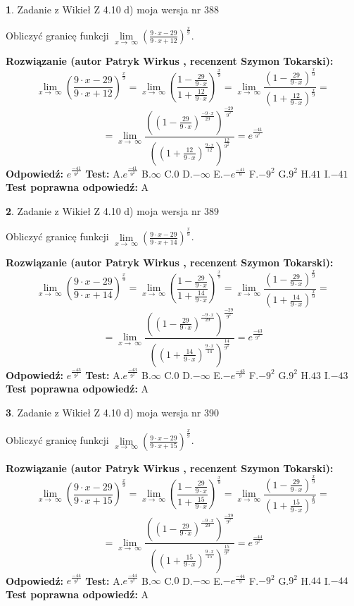 \documentclass[12pt, a4paper]{article}
\theoremstyle{definition} %
\newtheorem{zad}{}
\newcommand{\zadStart}[1]{\begin{zad}#1\newline}
\newcommand{\zadStop}{\end{zad}}
\newcommand{\rozwStart}[2]{\noindent \textbf{Rozwiązanie (autor #1 , recenzent #2): }\newline}
\newcommand{\rozwStop}{\newline}
\newcommand{\odpStart}{\noindent \textbf{Odpowiedź:}\newline}
\newcommand{\odpStop}{\newline}
\newcommand{\testStart}{\noindent \textbf{Test:}\newline}
\newcommand{\testStop}{\newline}
\newcommand{\kluczStart}{\noindent \textbf{Test poprawna odpowiedź:}\newline}
\newcommand{\kluczStop}{\newline}
\begin{document}
\zadStart{Zadanie z Wikieł Z 4.10 d) moja wersja nr 388}


Obliczyć granicę funkcji  $\lim\limits_{x\to\ \infty}(\frac{9\cdot x-29}{9\cdot x+12})^{\frac{x}{9}}$.
\zadStop
\rozwStart{Patryk Wirkus}{Szymon Tokarski}
$$\lim\limits_{x\to\ \infty}(\frac{9\cdot x-29}{9\cdot x+12})^{\frac{x}{9}} = \lim\limits_{x\to\ \infty}(\frac{1-\frac{29}{9\cdot x}}{1+\frac{12}{9\cdot x}})^{\frac{x}{9}}=\lim\limits_{x\to\ \infty}\frac{(1-\frac{29}{9\cdot x})^{\frac{x}{9}}}{(1+\frac{12}{9\cdot x})^{\frac{x}{9}}}=$$
$$=\lim\limits_{x\to\ \infty}\frac{((1-\frac{29}{9\cdot x})^{\frac{-9\cdot x}{29}})^{\frac{-29}{9^{2}}}}{((1+\frac{12}{9\cdot x})^{\frac{9\cdot x}{12}})^{\frac{12}{9^{2}}}}=e^{\frac{-41}{9^{2}}}$$
\rozwStop
\odpStart
$e^{\frac{-41}{9^{2}}}$
\odpStop
\testStart
A.$e^{\frac{-41}{9^{2}}}$ B.$\infty$ C.$0$ D.$-\infty$ E.$-e^{\frac{-41}{9}}$
F.$-9^{2}$ G.$9^{2}$
H.$41$
I.$-41$
\testStop
\kluczStart
A
\kluczStop



\zadStart{Zadanie z Wikieł Z 4.10 d) moja wersja nr 389}


Obliczyć granicę funkcji  $\lim\limits_{x\to\ \infty}(\frac{9\cdot x-29}{9\cdot x+14})^{\frac{x}{9}}$.
\zadStop
\rozwStart{Patryk Wirkus}{Szymon Tokarski}
$$\lim\limits_{x\to\ \infty}(\frac{9\cdot x-29}{9\cdot x+14})^{\frac{x}{9}} = \lim\limits_{x\to\ \infty}(\frac{1-\frac{29}{9\cdot x}}{1+\frac{14}{9\cdot x}})^{\frac{x}{9}}=\lim\limits_{x\to\ \infty}\frac{(1-\frac{29}{9\cdot x})^{\frac{x}{9}}}{(1+\frac{14}{9\cdot x})^{\frac{x}{9}}}=$$
$$=\lim\limits_{x\to\ \infty}\frac{((1-\frac{29}{9\cdot x})^{\frac{-9\cdot x}{29}})^{\frac{-29}{9^{2}}}}{((1+\frac{14}{9\cdot x})^{\frac{9\cdot x}{14}})^{\frac{14}{9^{2}}}}=e^{\frac{-43}{9^{2}}}$$
\rozwStop
\odpStart
$e^{\frac{-43}{9^{2}}}$
\odpStop
\testStart
A.$e^{\frac{-43}{9^{2}}}$ B.$\infty$ C.$0$ D.$-\infty$ E.$-e^{\frac{-43}{9}}$
F.$-9^{2}$ G.$9^{2}$
H.$43$
I.$-43$
\testStop
\kluczStart
A
\kluczStop



\zadStart{Zadanie z Wikieł Z 4.10 d) moja wersja nr 390}


Obliczyć granicę funkcji  $\lim\limits_{x\to\ \infty}(\frac{9\cdot x-29}{9\cdot x+15})^{\frac{x}{9}}$.
\zadStop
\rozwStart{Patryk Wirkus}{Szymon Tokarski}
$$\lim\limits_{x\to\ \infty}(\frac{9\cdot x-29}{9\cdot x+15})^{\frac{x}{9}} = \lim\limits_{x\to\ \infty}(\frac{1-\frac{29}{9\cdot x}}{1+\frac{15}{9\cdot x}})^{\frac{x}{9}}=\lim\limits_{x\to\ \infty}\frac{(1-\frac{29}{9\cdot x})^{\frac{x}{9}}}{(1+\frac{15}{9\cdot x})^{\frac{x}{9}}}=$$
$$=\lim\limits_{x\to\ \infty}\frac{((1-\frac{29}{9\cdot x})^{\frac{-9\cdot x}{29}})^{\frac{-29}{9^{2}}}}{((1+\frac{15}{9\cdot x})^{\frac{9\cdot x}{15}})^{\frac{15}{9^{2}}}}=e^{\frac{-44}{9^{2}}}$$
\rozwStop
\odpStart
$e^{\frac{-44}{9^{2}}}$
\odpStop
\testStart
A.$e^{\frac{-44}{9^{2}}}$ B.$\infty$ C.$0$ D.$-\infty$ E.$-e^{\frac{-44}{9}}$
F.$-9^{2}$ G.$9^{2}$
H.$44$
I.$-44$
\testStop
\kluczStart
A
\kluczStop
\end{document}
